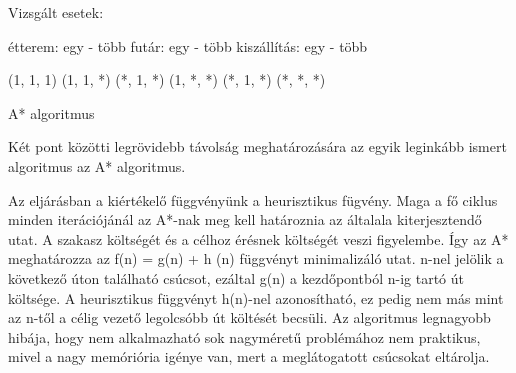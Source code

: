 

Vizsgált esetek:

étterem: egy - több
futár: egy - több
kiszállítás: egy - több

(1, 1, 1)
(1, 1, *)
(*, 1, *)
(1, *, *)
(*, 1, *)
(*, *, *)


A* algoritmus

Két pont közötti legrövidebb távolság meghatározására az egyik leginkább ismert algoritmus az A* algoritmus.

Az eljárásban a kiértékelő függvényünk a heurisztikus fügvény. Maga a fő ciklus minden iterációjánál az A*-nak meg kell határoznia az általala kiterjesztendő utat. A szakasz költségét és a célhoz érésnek költségét veszi figyelembe. Így az A* meghatározza az f(n) = g(n) + h (n) függvényt minimalizáló utat. n-nel jelölik a következő úton található csúcsot, ezáltal g(n) a kezdőpontból n-ig tartó út költsége. A heurisztikus függvényt h(n)-nel azonosítható, ez pedig nem más mint az n-től a célig vezető legolcsóbb út költését becsüli.
Az algoritmus legnagyobb hibája, hogy nem alkalmazható sok nagyméretű problémához nem praktikus, mivel a nagy memóriória igénye van, mert a meglátogatott csúcsokat eltárolja.

